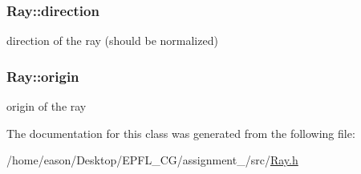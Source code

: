 \subsubsection[{\texorpdfstring{direction}{direction}}]{ Ray\+::direction}\hypertarget{classRay_a2b864cd91328207dc66e3ab4cd1e1e36}{}\label{classRay_a2b864cd91328207dc66e3ab4cd1e1e36}


direction of the ray (should be normalized) 

\subsubsection[{\texorpdfstring{origin}{origin}}]{ Ray\+::origin}\hypertarget{classRay_a3677f264c55cbe2f2cf450f9e0efa241}{}\label{classRay_a3677f264c55cbe2f2cf450f9e0efa241}


origin of the ray 



The documentation for this class was generated from the following file\+:\begin{DoxyCompactItemize}
\item 
/home/eason/\+Desktop/\+E\+P\+F\+L\+\_\+\+C\+G/assignment\+\_/src/\hyperlink{Ray_8h}{Ray.\+h}\end{DoxyCompactItemize}
